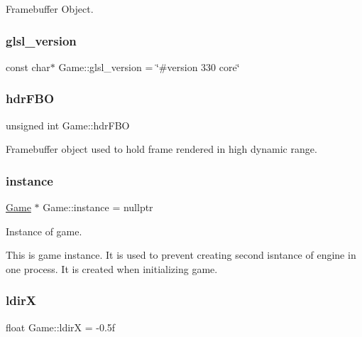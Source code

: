 Framebuffer Object. 

\mbox{\label{class_game_aaa8f957ef3a7b9a386f950ff1f6f89ef}} 
\subsubsection{\texorpdfstring{glsl\_version}{glsl\_version}}
{\footnotesize\ttfamily const char$\ast$ Game\+::glsl\+\_\+version = \char`\"{}\#version 330 core\char`\"{}}

\mbox{\label{class_game_aecf2b0705e36b7b510be741add10f974}} 
\subsubsection{\texorpdfstring{hdrFBO}{hdrFBO}}
{\footnotesize\ttfamily unsigned int Game\+::hdr\+F\+BO\hspace{0.3cm}{\ttfamily [protected]}}



Framebuffer object used to hold frame rendered in high dynamic range. 

\mbox{\label{class_game_aa469cdc0a30f4fd2d6d99b23f4fbf257}} 
\subsubsection{\texorpdfstring{instance}{instance}}
{\footnotesize\ttfamily \mbox{\hyperlink{class_game}{Game}} $\ast$ Game\+::instance = nullptr\hspace{0.3cm}{\ttfamily [static]}}



Instance of game. 

This is game instance. It is used to prevent creating second isntance of engine in one process. It is created when initializing game. \mbox{\label{class_game_a1b522d1c1f329aca47be60f3db2d9056}} 
\subsubsection{\texorpdfstring{ldirX}{ldirX}}
{\footnotesize\ttfamily float Game\+::ldirX = -\/0.\+5f}


